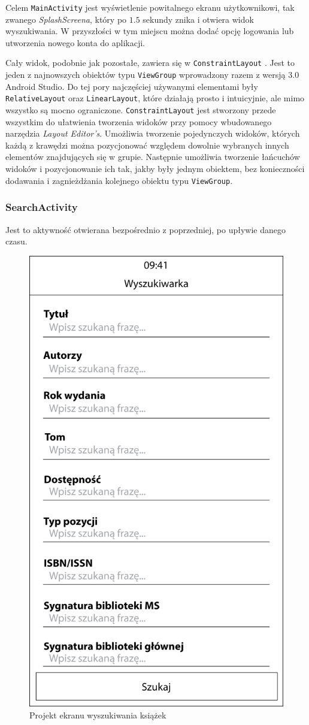\documentclass[twoside]{projektInzynierskiMS}
\begin{document}
Celem \verb`MainActivity` jest wyświetlenie powitalnego ekranu użytkownikowi, tak zwanego \textit{SplashScreena}, który po $1.5$ sekundy znika i otwiera widok wyszukiwania. W przyszłości w tym miejscu można dodać opcję logowania lub utworzenia nowego konta do aplikacji.

Cały widok, podobnie jak pozostałe, zawiera się w \verb`ConstraintLayout` \cite{constraintLayout}. Jest to jeden z najnowszych obiektów typu \verb`ViewGroup` wprowadzony razem z wersją $3.0$ Android Studio. Do tej pory najczęściej używanymi elementami były \verb`RelativeLayout` oraz \verb`LinearLayout`, które działają prosto i intuicyjnie, ale mimo wszystko są mocno ograniczone. \verb`ConstraintLayout` jest stworzony przede wszystkim do ułatwienia tworzenia widoków przy pomocy wbudowanego narzędzia \textit{Layout Editor's}. Umożliwia tworzenie pojedynczych widoków, których każdą z krawędzi można pozycjonować względem dowolnie wybranych innych elementów znajdujących się w grupie. Następnie umożliwia tworzenie łańcuchów widoków i pozycjonowanie ich tak, jakby były jednym obiektem, bez konieczności dodawania i zagnieżdżania kolejnego obiektu typu \verb`ViewGroup`. 

\subsubsection{SearchActivity}

Jest to aktywność otwierana bezpośrednio z poprzedniej, po upływie danego czasu. 

\begin{figure}[h]
  \centering
  \includegraphics[width=0.4\linewidth]{img/SearchProject.png}
  \caption{Projekt ekranu wyszukiwania książek}
  \label{fig:androidSearch}
\end{figure}
\end{document}
